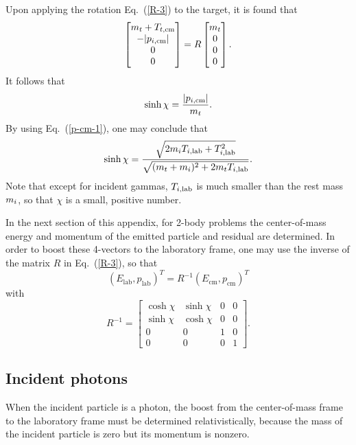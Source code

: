 {Upon applying the rotation Eq.~(\ref{R-3}) to the target,
it is found that
$$
     \begin{bmatrix}
        m_t + T_{t,\textrm{cm}} \\
        -|p_{i,\textrm{cm}}| \\
        0 \\
        0
     \end{bmatrix}
      = R
\begin{bmatrix}
        m_t \\
           0  \\
           0 \\
           0
     \end{bmatrix}.
$$
It follows that
\begin{equation}
   \sinh \chi = \frac{|p_{i,\textrm{cm}}|}{m_t}.
 \label{lab-to-cm}
\end{equation}
By using Eq.~(\ref{p-cm-1}), one may conclude that
\begin{equation}
  \sinh \chi = \frac{\sqrt{ 2 m_i T_{i,\textrm{lab}} + T_{i,\textrm{lab}}^2}}
    {\sqrt{( m_t + m_i )^2 + 2 m_t T_{i,\textrm{lab}} }}.
  \label{lab-to-cm-2}
\end{equation}
Note that except for incident gammas, $T_{i,\textrm{lab}}$ is much smaller
than the rest mass $m_i$, so that $\chi$ is a
small, positive number.

In the next section of this appendix, for 2-body problems
the center-of-mass energy and momentum of the
emitted particle and residual are determined.  In order to boost these 4-vectors
to the laboratory frame, one may use the inverse of the matrix $R$ in
Eq.~(\ref{R-3}), so that
\begin{equation}
  (E_{\text{lab}}, p_{\text{lab}})^T = R^{-1}(E_{\text{cm}}, p_{\text{cm}})^T
 \label{3d-map}
\end{equation}
with
\begin{equation}
   R^{-1} =
    \begin{bmatrix}
     \cosh \chi & \sinh \chi & 0 & 0 \\
     \sinh \chi & \cosh \chi & 0 & 0 \\
     0  & 0 & 1 & 0 \\
     0  & 0 & 0 & 1
  \end{bmatrix}.
  \label{R-3-inv}
\end{equation}

\subsection{Incident photons}
\label{Sec:photon-in}
When the incident particle is a photon, the boost from the 
center-of-mass frame to the laboratory frame must be determined
relativistically, because the mass of the incident particle is zero
but its momentum is nonzero.

}
